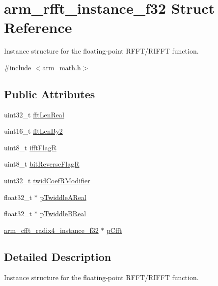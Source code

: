\hypertarget{structarm__rfft__instance__f32}{}\section{arm\+\_\+rfft\+\_\+instance\+\_\+f32 Struct Reference}
\label{structarm__rfft__instance__f32}


Instance structure for the floating-\/point R\+F\+F\+T/\+R\+I\+F\+FT function.  




{\ttfamily \#include $<$arm\+\_\+math.\+h$>$}

\subsection*{Public Attributes}
\begin{DoxyCompactItemize}
\item 
uint32\+\_\+t \hyperlink{structarm__rfft__instance__f32_a4219d4669699e4efdcb150ed7a0d9a57}{fft\+Len\+Real}
\item 
uint16\+\_\+t \hyperlink{structarm__rfft__instance__f32_a075076e07ebb8521d8e3b49a31db6c57}{fft\+Len\+By2}
\item 
uint8\+\_\+t \hyperlink{structarm__rfft__instance__f32_a5ee6d10a934ab4b666e0bb286c3d633f}{ifft\+FlagR}
\item 
uint8\+\_\+t \hyperlink{structarm__rfft__instance__f32_ac342f3248157cbbd2f04a3c8ec9fc9eb}{bit\+Reverse\+FlagR}
\item 
uint32\+\_\+t \hyperlink{structarm__rfft__instance__f32_aede85350fb5ae6baa1b3e8bfa15b18d6}{twid\+Coef\+R\+Modifier}
\item 
float32\+\_\+t $\ast$ \hyperlink{structarm__rfft__instance__f32_a534cc7e6e9b3e3dd022fad611c762142}{p\+Twiddle\+A\+Real}
\item 
float32\+\_\+t $\ast$ \hyperlink{structarm__rfft__instance__f32_a23543ecfd027fea2477fe1eea23c3c4d}{p\+Twiddle\+B\+Real}
\item 
\hyperlink{structarm__cfft__radix4__instance__f32}{arm\+\_\+cfft\+\_\+radix4\+\_\+instance\+\_\+f32} $\ast$ \hyperlink{structarm__rfft__instance__f32_a9f47ba9f50c81e4445ae3827b981bc05}{p\+Cfft}
\end{DoxyCompactItemize}


\subsection{Detailed Description}
Instance structure for the floating-\/point R\+F\+F\+T/\+R\+I\+F\+FT function. 

